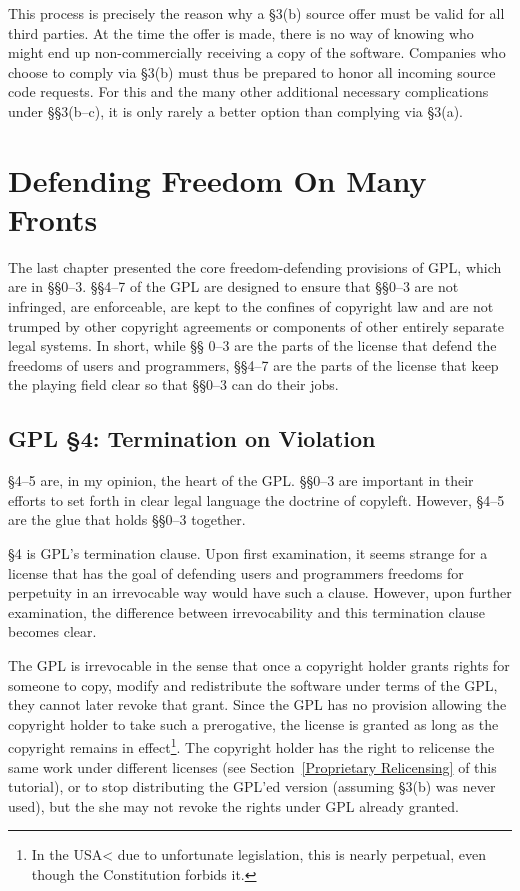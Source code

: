 \documentclass[12pt]{report}
\begin{document}
This process is precisely the reason why a \S 3(b) source offer must be
valid for all third parties.  At the time the offer is made, there is no
way of knowing who might end up non-commercially receiving a copy of the
software.  Companies who choose to comply via \S 3(b) must thus be
prepared to honor all incoming source code requests.  For this and the
many other additional necessary complications under \S\S 3(b--c), it is
only rarely a better option than complying via \S 3(a).


\chapter{Defending Freedom On Many Fronts}

The last chapter presented the core freedom-defending provisions of GPL\@,
which are in \S\S 0--3.  \S\S 4--7 of the GPL are designed to ensure that
\S\S 0--3 are not infringed, are enforceable, are kept to the confines of
copyright law and are not trumped by other copyright agreements or
components of other entirely separate legal systems.  In short, while \S\S
0--3 are the parts of the license that defend the freedoms of users and
programmers, \S\S 4--7 are the parts of the license that keep the playing
field clear so that \S\S 0--3 can do their jobs.

\section{GPL \S 4: Termination on Violation}
\label{GPLs4}

\S 4--5 are, in my opinion, the heart of the GPL\@. \S\S 0--3 are
important in their efforts to set forth in clear legal language the
doctrine of copyleft.  However, \S 4--5 are the glue that holds \S\S 0--3
together.

\S 4 is GPL's termination clause.  Upon first examination, it seems
strange for a license that has the goal of defending users and programmers
freedoms for perpetuity in an irrevocable way would have such a clause.
However, upon further examination, the difference between irrevocability
and this termination clause becomes clear.

The GPL is irrevocable in the sense that once a copyright holder grants
rights for someone to copy, modify and redistribute the software under
terms of the GPL, they cannot later revoke that grant.  Since the GPL has
no provision allowing the copyright holder to take such a prerogative, the
license is granted as long as the copyright remains in effect\footnote{In
  the USA< due to unfortunate legislation, this is nearly perpetual, even
  though the Constitution forbids it.}.  The copyright holder has the
right to relicense the same work under different licenses (see
Section~\ref{Proprietary Relicensing} of this tutorial), or to stop
distributing the GPL'ed version (assuming \S 3(b) was never used), but the
she may not revoke the rights under GPL already granted.
\end{document}
